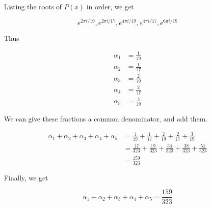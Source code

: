 Listing the roots of $P(x)$ in order, we get

$$ e^{2\pi i / 19}, e^{2\pi i / 17}, e^{4 \pi i / 19}, e^{4\pi i / 17}, e^{6\pi i / 19} $$

Thus

\begin{align*}
\alpha_1 &= \frac{1}{19} \\
\alpha_2 &= \frac{1}{17} \\
\alpha_3 &= \frac{2}{19} \\
\alpha_4 &= \frac{2}{17} \\
\alpha_5 &= \frac{3}{19}
\end{align*}

We can give these fractions a common denominator, and add them.

\begin{align*}
\alpha_1 + \alpha_2 + \alpha_3 + \alpha_4 + \alpha_5 &= \frac{1}{19} + \frac{1}{17} + \frac{2}{19} + \frac{2}{17} + \frac{3}{19} \\
&= \frac{17}{323} + \frac{19}{323} + \frac{34}{323} + \frac{38}{323} + \frac{51}{323} \\
&= \boxed{\frac{159}{323}}
\end{align*}

Finally, we get

$$ \boxed{\alpha_1 + \alpha_2 + \alpha_3 + \alpha_4 + \alpha_5 = \frac{159}{323}} $$
